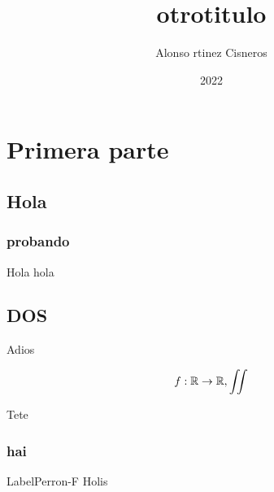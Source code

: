 \documentclass[colorful]{sty/itam-thesis}
\author{Alonso rtinez Cisneros}
\title{otrotitulo}
\date{2022}
\begin{document}
\frontmatter
\maketitle
\makefrontmatter

\mainmatter

\part{Primera parte}
\chapter{Hola}

\lipsum[1-10]

\section{probando}
Hola hola

\chapter{DOS}

Adios

\begin{equation}
	f: \mathbb{R} \to \mathbb{R}, \iint
\end{equation}

Tete

\section{hai}

\begin{mytheo}{Label}{Perron-F}
	Holis
\end{mytheo}
\end{document}

